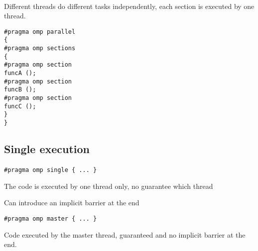 \paragraph{}

Different threads do different tasks independently, each section is executed by one thread.













\begin{verbatim}
#pragma omp parallel
{
#pragma omp sections
{
#pragma omp section
funcA ();
#pragma omp section
funcB ();
#pragma omp section
funcC ();
}
}

\end{verbatim}



\subsection*{Single execution}

\paragraph{}


\begin{verbatim}
#pragma omp single { ... }

\end{verbatim}

The code is executed by one thread only, no guarantee which thread

Can introduce an implicit barrier at the end


\begin{verbatim}
#pragma omp master { ... }

\end{verbatim}

Code executed by the master thread, guaranteed and no implicit barrier at the end.



